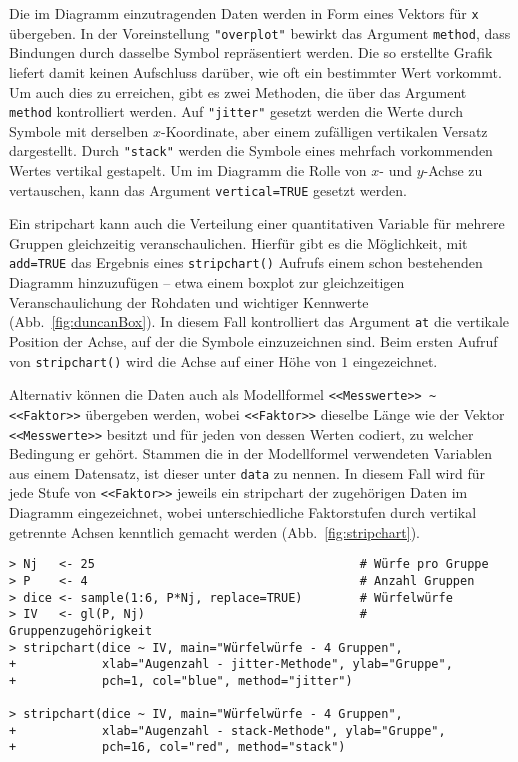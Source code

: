 Die im Diagramm einzutragenden Daten werden in Form eines Vektors für \lstinline!x! übergeben. In der Voreinstellung \lstinline!"overplot"! bewirkt das Argument \lstinline!method!, dass Bindungen durch dasselbe Symbol repräsentiert werden. Die so erstellte Grafik liefert damit keinen Aufschluss darüber, wie oft ein bestimmter Wert vorkommt. Um auch dies zu erreichen, gibt es zwei Methoden, die über das Argument \lstinline!method! kontrolliert werden. Auf \lstinline!"jitter"! gesetzt werden die Werte durch Symbole mit derselben $x$-Koordinate, aber einem zufälligen vertikalen Versatz dargestellt. Durch \lstinline!"stack"! werden die Symbole eines mehrfach vorkommenden Wertes vertikal gestapelt. Um im Diagramm die Rolle von $x$- und $y$-Achse zu vertauschen, kann das Argument \lstinline!vertical=TRUE! gesetzt werden.

Ein stripchart kann auch die Verteilung einer quantitativen Variable für mehrere Gruppen gleichzeitig veranschaulichen. Hierfür gibt es die Möglichkeit, mit \lstinline!add=TRUE! das Ergebnis eines \lstinline!stripchart()! Aufrufs einem schon bestehenden Diagramm hinzuzufügen -- etwa einem boxplot zur gleichzeitigen Veranschaulichung der Rohdaten und wichtiger Kennwerte (Abb.\ \ref{fig:duncanBox}). In diesem Fall kontrolliert das Argument \lstinline!at! die vertikale Position der Achse, auf der die Symbole einzuzeichnen sind. Beim ersten Aufruf von \lstinline!stripchart()! wird die Achse auf einer Höhe von $1$ eingezeichnet.

Alternativ können die Daten auch als Modellformel \lstinline!<<Messwerte>> ~ <<Faktor>>! übergeben werden, wobei \lstinline!<<Faktor>>! dieselbe Länge wie der Vektor \lstinline!<<Messwerte>>! besitzt und für jeden von dessen Werten codiert, zu welcher Bedingung er gehört. Stammen die in der Modellformel verwendeten Variablen aus einem Datensatz, ist dieser unter \lstinline!data! zu nennen. In diesem Fall wird für jede Stufe von \lstinline!<<Faktor>>! jeweils ein stripchart der zugehörigen Daten im Diagramm eingezeichnet, wobei unterschiedliche Faktorstufen durch vertikal getrennte Achsen kenntlich gemacht werden (Abb.\ \ref{fig:stripchart}).
\begin{lstlisting}
> Nj   <- 25                                     # Würfe pro Gruppe
> P    <- 4                                      # Anzahl Gruppen
> dice <- sample(1:6, P*Nj, replace=TRUE)        # Würfelwürfe
> IV   <- gl(P, Nj)                              # Gruppenzugehörigkeit
> stripchart(dice ~ IV, main="Würfelwürfe - 4 Gruppen",
+            xlab="Augenzahl - jitter-Methode", ylab="Gruppe",
+            pch=1, col="blue", method="jitter")

> stripchart(dice ~ IV, main="Würfelwürfe - 4 Gruppen",
+            xlab="Augenzahl - stack-Methode", ylab="Gruppe",
+            pch=16, col="red", method="stack")
\end{lstlisting}

